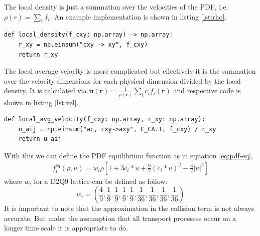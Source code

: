 The local density is just a summation over the velocities of the PDF, i.e. $\rho(r) = \sum_{i} f_{i}$.
An example implementation is shown in listing \ref{lst:rho}.
\begin{center}
\begin{lstlisting}[caption=Implementation of the local density,label=lst:rho, basicstyle=\small]
def local_density(f_cxy: np.array) -> np.array:
    r_xy = np.einsum("cxy -> xy", f_cxy)
    return r_xy
  \end{lstlisting}
\end{center}
The local average velocity is more complicated but effectively it is the summation over the velocity dimensions for each physical dimension divided by the local density.
It is calculated via $\textbf{u}(\textbf{r})=\frac{1}{\rho (\textbf{r})} \sum_{i} c_{i}f_{i}(\textbf{r})$ and respective code is shown in listing \ref{lst:vel}.
\begin{center}
  \begin{lstlisting}[caption=Implementation of the local average velocity.,label=lst:vel, basicstyle=\small]
def local_avg_velocity(f_cxy: np.array, r_xy: np.array):
    u_aij = np.einsum("ac, cxy->axy", C_CA.T, f_cxy) / r_xy
    return u_aij
  \end{lstlisting}
\end{center}
With this we can define the PDF equilibrium function as in equation \ref{eq:pdf-eq},
\begin{equation}
  \label{eq:pdf-eq}
  \begin{aligned}
    f_{i}^{eq} ( \rho , u ) = w_i \rho \left[ 1+3 c_i * u + \frac{9}{2}(c_i * u )^2 - \frac{3}{2} | u |^2 \right]
  \end{aligned}
\end{equation}
where $w_i$ for a D2Q9 lattice can be defined as follow: 
\begin{equation}
w_i = \left( \frac{4}{9}, \frac{1}{9}, \frac{1}{9}, \frac{1}{9}, \frac{1}{9}, \frac{1}{36}, \frac{1}{36}, \frac{1}{36}, \frac{1}{36} \right)
\end{equation}
It is important to note that the approximation in the collision term is not always accurate.
But under the assumption that all transport processes occur on a longer time scale it is appropriate to do.

